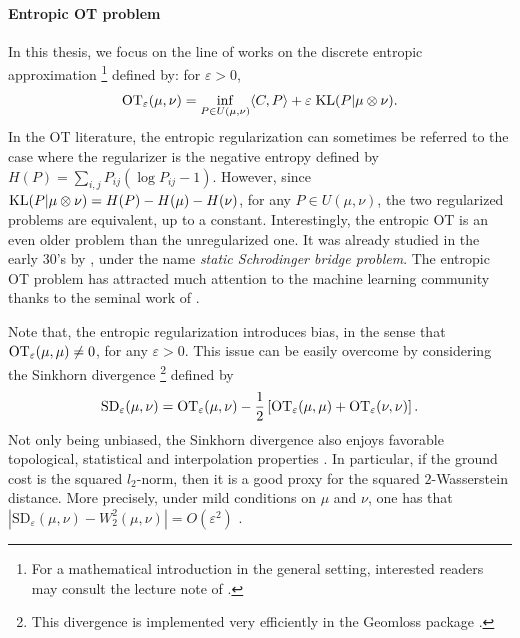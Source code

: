 \paragraph{Entropic OT problem}
In this thesis, we focus on the line of works on the discrete entropic approximation
\footnote{For a mathematical introduction in the general setting,
interested readers may consult the lecture note of \citet{Nutz22}.} defined by:
for $\varepsilon > 0$,
\begin{align}
  \label{eq:primal_ot}
  \text{OT}_{\varepsilon}(\mu, \nu) = \inf_{P \in U(\mu, \nu)} \langle C, P \rangle +
  \varepsilon \; \text{KL}(P | \mu \otimes \nu).
\end{align}
In the OT literature, the entropic regularization can sometimes be referred to the case where
the regularizer is the negative entropy defined by $H(P) = \sum_{i,j} P_{ij} (\log P_{ij} - 1)$.
However, since $\text{KL}(P | \mu \otimes \nu) = H(P) - H(\mu) - H(\nu)$, for any $P \in U(\mu, \nu)$,
the two regularized problems are equivalent, up to a constant.
Interestingly, the entropic OT is an even older problem than the unregularized one.
It was already studied in the early 30's by \citet{Schrodinger32},
under the name \textit{static Schrodinger bridge problem}.
The entropic OT problem has attracted much attention to the
machine learning community thanks to the seminal work of \citet{Cuturi13}.

Note that, the entropic regularization introduces bias,
in the sense that $\text{OT}_{\varepsilon}(\mu, \mu) \neq 0$, for any $\varepsilon > 0$.
This issue can be easily overcome by considering the Sinkhorn divergence
\footnote{This divergence is implemented very efficiently in the Geomloss package \citep{Feydy19}.}
\citep{Ramdas17,Feydy19} defined by
\begin{align}
  \text{SD}_{\varepsilon}(\mu, \nu) = \text{OT}_{\varepsilon}(\mu, \nu)
  - \frac{1}{2} \left[ \text{OT}_{\varepsilon}(\mu, \mu) + \text{OT}_{\varepsilon}(\nu, \nu) \right].
\end{align}
Not only being unbiased, the Sinkhorn divergence also enjoys favorable topological, statistical
and interpolation properties \citep{Feydy19,Genevay19}. In particular,
if the ground cost is the squared $l_2$-norm, then it is a good proxy
for the squared $2$-Wasserstein distance. More precisely, under mild conditions on $\mu$ and $\nu$,
one has that $| \text{SD}_{\varepsilon}(\mu, \nu) - W_2^2(\mu, \nu) | = O(\varepsilon^2)$
\citep{Chizat20}.

